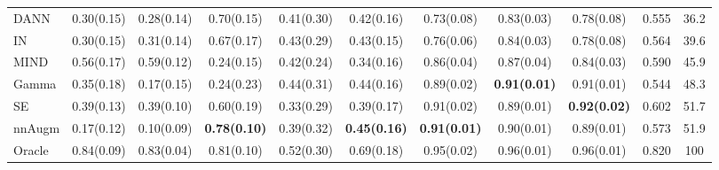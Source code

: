 \begin{landscape}
\begin{table}[p]
\begin{tabular}{lcccccccccc}
			DANN & 0.30(0.15) & 0.28(0.14) & 0.70(0.15) & 0.41(0.30) & 0.42(0.16) & 0.73(0.08) & 0.83(0.03) & 0.78(0.08) & 0.555 & 36.2 \\
			
			IN & 0.30(0.15) & 0.31(0.14) & 0.67(0.17) & 0.43(0.29) & 0.43(0.15) & 0.76(0.06) & 0.84(0.03) & 0.78(0.08) & 0.564 & 39.6 \\
			
			MIND & 0.56(0.17) & 0.59(0.12) & 0.24(0.15) & 0.42(0.24) & 0.34(0.16) & 0.86(0.04) & 0.87(0.04) & 0.84(0.03) & 0.590 & 45.9 \\
			
			Gamma & 0.35(0.18) & 0.17(0.15) & 0.24(0.23) & 0.44(0.31) & 0.44(0.16) & 0.89(0.02) & \textbf{0.91(0.01)} & 0.91(0.01) & 0.544 & 48.3 \\
			
			SE & 0.39(0.13) & 0.39(0.10) & 0.60(0.19) & 0.33(0.29) & 0.39(0.17) & 0.91(0.02) & 0.89(0.01) & \textbf{0.92(0.02)} & 0.602 & 51.7 \\
			
			nnAugm & 0.17(0.12) & 0.10(0.09) & \textbf{0.78(0.10)} & 0.39(0.32) & \textbf{0.45(0.16)} & \textbf{0.91(0.01)} & 0.90(0.01) & 0.89(0.01) & 0.573 & 51.9 \\
			
			\midrule
			
			Oracle & 0.84(0.09) & 0.83(0.04) & 0.81(0.10) & 0.52(0.30) & 0.69(0.18) & 0.95(0.02) & 0.96(0.01) & 0.96(0.01) & 0.820 & 100 \\
			
			\bottomrule
			
		\end{tabular}%
	
\end{table}
\end{landscape}


